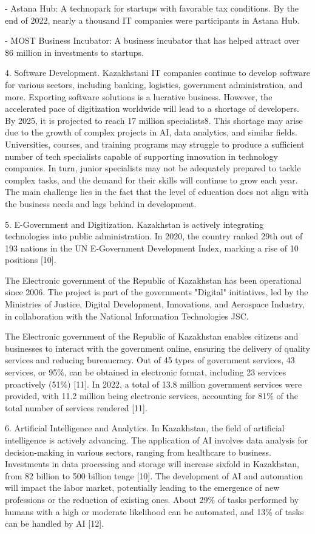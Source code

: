 - Astana Hub: A technopark for startups with favorable tax conditions.
By the end of 2022, nearly a thousand IT companies were participants in
Astana Hub.

- MOST Business Incubator: A business incubator that has helped attract
over \$6 million in investments to startups.

4. Software Development. Kazakhstani IT companies continue to develop
software for various sectors, including banking, logistics, government
administration, and more. Exporting software solutions is a lucrative
business. However, the accelerated pace of digitization worldwide will
lead to a shortage of developers. By 2025, it is projected to reach 17
million specialists8. This shortage may arise due to the growth of
complex projects in AI, data analytics, and similar fields.
Universities, courses, and training programs may struggle to produce a
sufficient number of tech specialists capable of supporting innovation
in technology companies. In turn, junior specialists may not be
adequately prepared to tackle complex tasks, and the demand for their
skills will continue to grow each year. The main challenge lies in the
fact that the level of education does not align with the business needs
and lags behind in development.

5. E-Government and Digitization. Kazakhstan is actively integrating
technologies into public administration. In 2020, the country ranked
29th out of 193 nations in the UN E-Government Development Index,
marking a rise of 10 positions {[}10{]}.

The Electronic government of the Republic of Kazakhstan has been
operational since 2006. The project is part of the
government\textquotesingle s "Digital" initiatives, led by the
Ministries of Justice, Digital Development, Innovations, and Aerospace
Industry, in collaboration with the National Information Technologies
JSC.

The Electronic government of the Republic of Kazakhstan enables citizens
and businesses to interact with the government online, ensuring the
delivery of quality services and reducing bureaucracy. Out of 45 types
of government services, 43 services, or 95\%, can be obtained in
electronic format, including 23 services proactively (51\%) {[}11{]}. In
2022, a total of 13.8 million government services were provided, with
11.2 million being electronic services, accounting for 81\% of the total
number of services rendered {[}11{]}.

6. Artificial Intelligence and Analytics. In Kazakhstan, the field of
artificial intelligence is actively advancing. The application of AI
involves data analysis for decision-making in various sectors, ranging
from healthcare to business. Investments in data processing and storage
will increase sixfold in Kazakhstan, from 82 billion to 500 billion
tenge {[}10{]}. The development of AI and automation will impact the
labor market, potentially leading to the emergence of new professions or
the reduction of existing ones. About 29\% of tasks performed by humans
with a high or moderate likelihood can be automated, and 13\% of tasks
can be handled by AI {[}12{]}.

